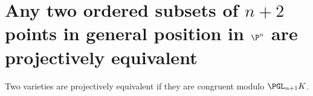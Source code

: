 

\section{Any two ordered subsets of $n+2$ points in general position in $\P^n$ are projectively equivalent}

Two varieties are projectively equivalent if they are congruent modulo $\PGL_{n+1}K$.

